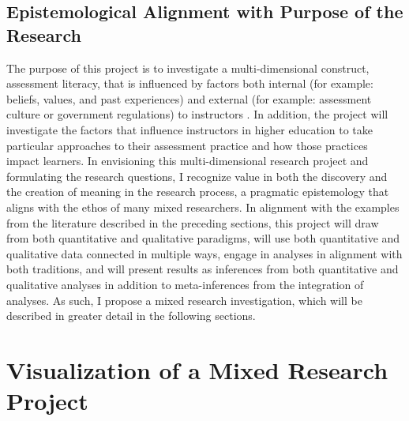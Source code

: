 \documentclass[
]{book}
\begin{document}
\hypertarget{epistemological-alignment-with-purpose-of-the-research}{%
\subsection{Epistemological Alignment with Purpose of the Research}\label{epistemological-alignment-with-purpose-of-the-research}}

The purpose of this project is to investigate a multi-dimensional construct, assessment literacy, that is influenced by factors both internal (for example: beliefs, values, and past experiences) and external (for example: assessment culture \citep{delucaExploringAssessmentCultures2021, masseyAssessmentLiteracyCollege2020} or government regulations) to instructors \citep{delucaDifferentialSituatedView2019}. In addition, the project will investigate the factors that influence instructors in higher education to take particular approaches to their assessment practice and how those practices impact learners. In envisioning this multi-dimensional research project and formulating the research questions, I recognize value in both the discovery and the creation of meaning in the research process, a pragmatic epistemology that aligns with the ethos of many mixed researchers. In alignment with the examples from the literature described in the preceding sections, this project will draw from both quantitative and qualitative paradigms, will use both quantitative and qualitative data connected in multiple ways, engage in analyses in alignment with both traditions, and will present results as inferences from both quantitative and qualitative analyses in addition to meta-inferences \citep[p.~62]{bazeleyIntegratingAnalysesMixed2018} from the integration of analyses. As such, I propose a mixed research investigation, which will be described in greater detail in the following sections.

\hypertarget{visualization-of-a-mixed-research-project}{%
\section{Visualization of a Mixed Research Project}\label{visualization-of-a-mixed-research-project}}
\end{document}
